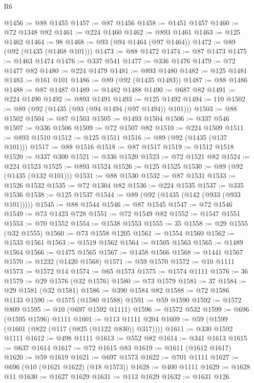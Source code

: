 \begin{lexlean}{R6}
\begin{coremodule}
@1456 := @88 @1455
@1457 := @87 @1456
@1458 := @1451 @1457
@1460 := @72 @1348 @82
@1461 := @224 @1460
@1462 := @893 @1461
@1463 := @125 @1462
@1464 := 98
@1468 := @93 (@94 @1464 (@97 @1464))
@1472 := @89 (@92 (@1435 (@1468 @101)))
@1473 := @88 @1472
@1474 := @87 @1473
@1475 := @1463 @1474
@1476 := @337 @541
@1477 := @336 @1476
@1479 := @72 @1477 @82
@1480 := @224 @1479
@1481 := @893 @1480
@1482 := @125 @1481
@1483 := @161 @101
@1486 := @89 (@92 (@1435 @1483))
@1487 := @88 @1486
@1488 := @87 @1487
@1489 := @1482 @1488
@1490 := @687 @82
@1491 := @224 @1490
@1492 := @893 @1491
@1493 := @125 @1492
@1494 := 110
@1502 := @89 (@92 (@1435 (@93 (@94 @1494 (@97 @1494)) @101)))
@1503 := @88 @1502
@1504 := @87 @1503
@1505 := @1493 @1504
@1506 := @337 @546
@1507 := @336 @1506
@1509 := @72 @1507 @82
@1510 := @224 @1509
@1511 := @893 @1510
@1512 := @125 @1511
@1516 := @89 (@92 (@1435 (@137 @101)))
@1517 := @88 @1516
@1518 := @87 @1517
@1519 := @1512 @1518
@1520 := @337 @300
@1521 := @336 @1520
@1523 := @72 @1521 @82
@1524 := @224 @1523
@1525 := @893 @1524
@1526 := @125 @1525
@1530 := @89 (@92 (@1435 (@132 @101)))
@1531 := @88 @1530
@1532 := @87 @1531
@1533 := @1526 @1532
@1535 := @72 @1304 @82
@1536 := @224 @1535
@1537 := @335 @1536
@1538 := @125 @1537
@1544 := @89 (@92 (@1435 (@142 (@933 (@933 @101)))))
@1545 := @88 @1544
@1546 := @87 @1545
@1547 := @72 @1546
@1549 := @73 @1423 @728
@1551 := @72 @1549 @82
@1552 := @1547 @1551
@1553 := @70 @1552
@1554 := @1538 @1553
@1555 := 35
@1558 := @29 @1555 (@32 @1555)
@1560 := @73 @1558 @1205
@1561 := @1554 @1560
@1562 := @1533 @1561
@1563 := @1519 @1562
@1564 := @1505 @1563
@1565 := @1489 @1564
@1566 := @1475 @1565
@1567 := @1458 @1566
@1568 := @1441 @1567
@1570 := @1232 (@1420 @1568)
@1571 := @59 @1570
@1572 := @10 @1111
@1573 := @1572 @14
@1574 := @65 @1573
@1575 := @1574 @1111
@1576 := 36
@1579 := @29 @1576 (@32 @1576)
@1580 := @73 @1579
@1581 := 37
@1584 := @29 @1581 (@32 @1581)
@1586 := @390 @1584 @82
@1588 := @72 @1586 @1133
@1590 := @1575 (@1580 @1588)
@1591 := @59 @1590
@1592 := @1572 @809
@1595 := @10 (@697 @1592 @1111)
@1596 := @1572 @532
@1599 := @696 (@1595 @1596) @1111
@1601 := @113 @1111 @204
@1609 := @59 (@1599 (@1601 (@822 (@117 (@825 (@1122 @830)) @317))))
@1611 := @330 @1592 @1111
@1612 := @498 @1111
@1613 := @552 @82
@1614 := @341 @1613
@1615 := @637 @1614
@1617 := @72 @1615 @83
@1619 := @1611 (@1612 @1617)
@1620 := @59 @1619
@1621 := @697 @1573
@1622 := @701 @1111
@1627 := @696 (@10 (@1621 @1622) (@18 @1573))
@1628 := @400 @1111
@1629 := @1628 @11
@1630 := @1627 @1629
@1631 := @113 @1629
@1632 := @1631 @126

\end{coremodule}
\end{lexlean}
